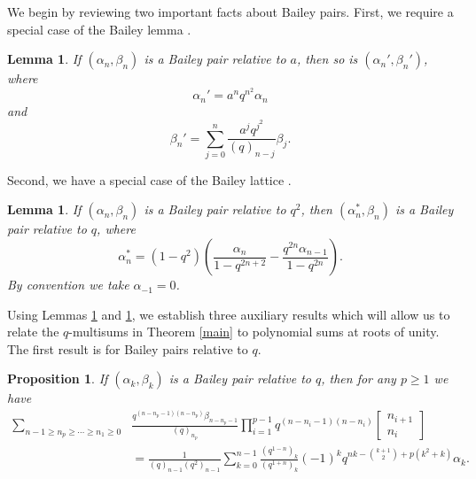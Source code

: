 \documentclass[11pt,reqno]{amsart}
\newtheorem{lemma}[theorem]{Lemma}
\newtheorem{proposition}[theorem]{Proposition}
\theoremstyle{definition}
\numberwithin{equation}{section}
\renewcommand{\=}{\;=\;}
\begin{document}
We begin by reviewing two important facts about Bailey pairs.   First, we require a special case of the Bailey lemma \cite{An1}.
\begin{lemma} \label{Baileylemma}
If $(\alpha_n,\beta_n)$ is a Bailey pair relative to $a$, then so is $(\alpha_n',\beta_n')$, where
\begin{equation} \label{alphaprime}
\alpha_n' = a^nq^{n^2}\alpha_n 
\end{equation}
and
\begin{equation} \label{betaprime}
\beta_n' = \sum_{j=0}^n \frac{a^jq^{j^2}}{(q)_{n-j}} \beta_j.
\end{equation}
\end{lemma} 
Second, we have a special case of the Bailey lattice \cite{Ag-An-Br1}.
\begin{lemma} \label{Baileylattice}
If $(\alpha_n,\beta_n)$ is a Bailey pair relative to $q^2$, then $(\alpha_n^*,\beta_n)$ is a Bailey pair relative to $q$, where
\begin{equation} \label{alphastar}
\alpha_n^* = (1-q^2)\left(\frac{\alpha_n}{1-q^{2n+2}} - \frac{q^{2n}\alpha_{n-1}}{1-q^{2n}} \right).
\end{equation} 
By convention we take $\alpha_{-1} = 0 $.
\end{lemma}

Using Lemmas \ref{Baileylemma} and \ref{Baileylattice}, we establish three auxiliary results which will allow us to relate the $q$-multisums in Theorem \ref{main} to polynomial sums at roots of unity.  The first result is for Bailey pairs relative to $q$.

\begin{proposition} \label{keychainlemma}
If $(\alpha_k,\beta_k)$ is a Bailey pair relative to $q$, then for any $p \geq 1$ we have
\begin{equation} \label{keychainlemmaeq}
\begin{aligned}
\sum_{n-1 \geq n_p \geq \cdots \geq n_1\geq 0}& \frac{q^{(n-n_p-1)(n-n_p)}\beta_{n-n_p-1}}{(q)_{n_p}} \prod_{i=1}^{p-1} q^{(n-n_i-1)(n-n_i)} \begin{bmatrix} n_{i+1} \\ n_i \end{bmatrix} \\
&= \frac{1}{(q)_{n-1}(q^2)_{n-1}} \sum_{k=0}^{n-1} \frac{(q^{1-n})_k}{(q^{1+n})_k}(-1)^kq^{nk -\binom{k+1}{2} + p(k^2+k)}\alpha_k.
\end{aligned}
\end{equation}
\end{proposition}
\end{document}
